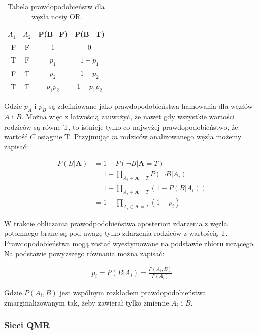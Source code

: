 \documentclass{article}
\begin{document}
\begin{table}
\caption{Tabela prawdopodobieństw dla węzła nosiy OR}
\label{nosiy OR}
\centering
\begin{tabular}{|r|c|c|c|}
  \hline 
  $A_1$ & $A_2$ & P(B=F) & P(B=T)\\
  \hline
  F & F & $1$ & $0$\\
  \hline
  T & F & $p_1$ & $1-p_1$ \\
  \hline
  F & T & $p_2$ & $1-p_2$ \\
  \hline
  T & T & $p_1 p_2$ & $1 - p_1 p_2$ \\
  \hline
\end{tabular}
\end{table} 

Gdzie $p_A$ i $p_B$ są zdefiniowane jako prawdopodobieństwa hamowania dla węzłów $A$ i $B$. Można więc z łatwością zauważyć, że nawet gdy wszystkie wartości rodziców są równe T, to istnieje tylko co najwyżej prawdopodobieństwo, że wartość $C$ osiągnie T. Przyjmując $m$ rodziców analizowanego węzła możemy zapisać:

\begin{equation}
\begin{aligned}
	P(B|\mathbf{A}) &= 1 - P(\neg B | \mathbf{A}=T) \\
	&= 1 - \prod_{A_i \in \mathbf{A}=T} P(\neg B | A_i) \\
	&= 1 - \prod_{A_i \in \mathbf{A}=T} (1 - P(B|A_i)) \\
	&= 1 - \prod_{A_i \in \mathbf{A}=T} (1 - p_i)
\end{aligned}
\end{equation}

W trakcie obliczania prawodpodobieństwa aposteriori zdarzenia z węzła potomnego brane są pod uwagę tylko zdarzenia rodziców z wartością T. Prawdopodobieństwa mogą zostać wyestymowane na podstawie zbioru uczącego. Na podstawie powyższego równania można zapisać:

\begin{equation}
\begin{aligned}
	p_i = P(B|A_i) = \frac{P(A_i, B)}{P(A_i)}
\end{aligned}
\end{equation}

Gdzie $P(A_i, B)$ jest wspólnym rozkładem prawdopodobieństwa zmarginalizowanym tak, żeby zawierał tylko zmienne $A_i$ i $B$.

\subsubsection{Sieci QMR}
\end{document}
